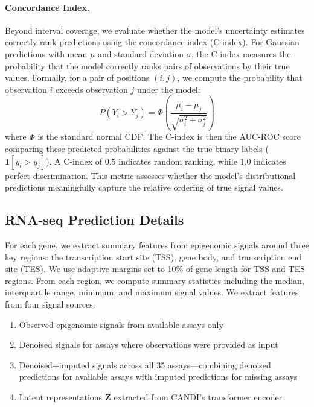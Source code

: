 \paragraph{Concordance Index.}
Beyond interval coverage, we evaluate whether the model's uncertainty estimates correctly rank predictions using the concordance index (C-index). For Gaussian predictions with mean $\mu$ and standard deviation $\sigma$, the C-index measures the probability that the model correctly ranks pairs of observations by their true values. Formally, for a pair of positions $(i, j)$, we compute the probability that observation $i$ exceeds observation $j$ under the model:
\begin{equation}
    P(Y_i > Y_j) = \Phi\left(\frac{\mu_i - \mu_j}{\sqrt{\sigma_i^2 + \sigma_j^2}}\right)
\end{equation}
where $\Phi$ is the standard normal CDF. The C-index is then the AUC-ROC score comparing these predicted probabilities against the true binary labels ($\mathbf{1}[y_i > y_j]$). A C-index of 0.5 indicates random ranking, while 1.0 indicates perfect discrimination. This metric assesses whether the model's distributional predictions meaningfully capture the relative ordering of true signal values.

\subsection{RNA-seq Prediction Details}

For each gene, we extract summary features from epigenomic signals around three key regions: the transcription start site (TSS), gene body, and transcription end site (TES). We use adaptive margins set to 10\% of gene length for TSS and TES regions. From each region, we compute summary statistics including the median, interquartile range, minimum, and maximum signal values. We extract features from four signal sources:
\begin{enumerate}
    \item Observed epigenomic signals from available assays only
    \item Denoised signals for assays where observations were provided as input
    \item Denoised+imputed signals across all 35 assays---combining denoised predictions for available assays with imputed predictions for missing assays
    \item Latent representations $\mathbf{Z}$ extracted from CANDI's transformer encoder
\end{enumerate}

